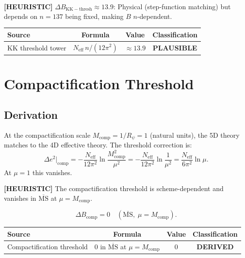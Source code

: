 \documentclass[11pt,a4paper]{article}
\newcommand{\heuristic}[1]{\textbf{[HEURISTIC]} #1}
\begin{document}
\heuristic{$\Delta B_\mathrm{KK-thresh} \approx 13.9$}: Physical (step-function matching)
but depends on $n = 137$ being fixed, making $B$ $n$-dependent.

\begin{center}
\begin{tabular}{lccc}
\toprule
Source & Formula & Value & Classification \\\midrule
KK threshold tower & $N_\mathrm{eff}\,n/(12\pi^2)$ & $\approx 13.9$ & \textbf{PLAUSIBLE} \\\bottomrule
\end{tabular}
\end{center}

\section{Compactification Threshold}

\subsection{Derivation}

At the compactification scale $M_\mathrm{comp} = 1/R_\psi = 1$ (natural units),
the 5D theory matches to the 4D effective theory.  The threshold correction is:
\begin{equation}
  \Delta e^2\big|_\mathrm{comp}
  = -\frac{N_\mathrm{eff}}{12\pi^2}\ln\frac{M_\mathrm{comp}^2}{\mu^2}
  = -\frac{N_\mathrm{eff}}{12\pi^2}\ln\frac{1}{\mu^2}
  = \frac{N_\mathrm{eff}}{6\pi^2}\ln\mu.
\end{equation}
At $\mu = 1$ this vanishes.

\heuristic{The compactification threshold is scheme-dependent and vanishes in
$\overline{\mathrm{MS}}$ at $\mu = M_\mathrm{comp}$.}

\begin{equation}
  \Delta B_\mathrm{comp} = 0 \quad (\overline{\mathrm{MS}},\; \mu = M_\mathrm{comp}).
\end{equation}

\begin{center}
\begin{tabular}{lccc}
\toprule
Source & Formula & Value & Classification \\\midrule
Compactification threshold & 0 in $\overline{\mathrm{MS}}$ at $\mu=M_\mathrm{comp}$ & $0$ & \textbf{DERIVED} \\\bottomrule
\end{tabular}
\end{center}
\end{document}

